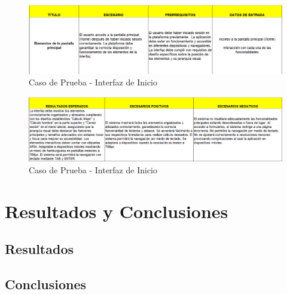 \documentclass[12pt,letterpaper,spanish, xcolor=table]{report}
\numberwithin{figure}{subsection}
\begin{document}
	\begin{figure}[H]
		\centering
		\includegraphics[width=1.0\textwidth]
		{Imagenes/CalculadoraNutricional/CPInicio.png}
		\caption{Caso de Prueba - Interfaz de Inicio
		}\label{a2}
	\end{figure}
	
	\begin{figure}[H]
		\centering
		\includegraphics[width=1.0\textwidth]
		{Imagenes/CalculadoraNutricional/CPInicio2.png}
		\caption{Caso de Prueba - Interfaz de Inicio
		}\label{a2}
	\end{figure}
	
	
	
	
\chapter{Resultados y Conclusiones}
\newpage
	
\section{Resultados}

\section{Conclusiones}


	
\end{document}
